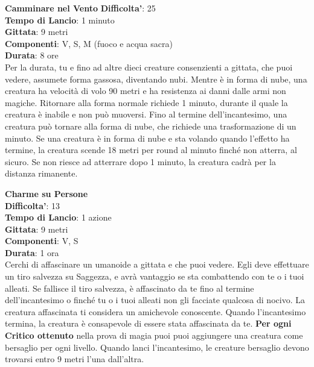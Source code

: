 \begin{multicols}{2}
\medskip\textbf{Camminare nel Vento}
\textbf{Difficolta'}: 25\\
\textbf{Tempo di Lancio}: 1 minuto\\
\textbf{Gittata}: 9 metri\\
\textbf{Componenti}: V, S, M (fuoco e acqua sacra)\\
\textbf{Durata}: 8 ore\\
Per la durata, tu e fino ad altre dieci creature consenzienti a gittata, che puoi vedere, assumete forma gassosa, diventando nubi. Mentre è in forma di nube, una creatura ha velocità di volo 90 metri e ha resistenza ai danni dalle armi non magiche. Ritornare alla forma normale richiede 1 minuto, durante il quale la creatura è inabile e non può muoversi. Fino al termine dell’incantesimo, una creatura può tornare alla forma di nube, che richiede una trasformazione di un minuto. Se una creatura è in forma di nube e sta volando quando l’effetto ha termine, la creatura scende 18 metri per round al minuto finché non atterra, al sicuro. Se non riesce ad atterrare dopo 1 minuto, la creatura cadrà per la distanza rimanente.

\medskip\textbf{Charme su Persone}\\
\textbf{Difficolta'}: 13\\
\textbf{Tempo di Lancio}: 1 azione\\
\textbf{Gittata}: 9 metri\\
\textbf{Componenti}: V, S\\
\textbf{Durata}: 1 ora\\
Cerchi di affascinare un umanoide a gittata e che puoi vedere. Egli deve effettuare un tiro salvezza su Saggezza, e avrà vantaggio se sta combattendo con te o i tuoi alleati. Se fallisce il tiro salvezza, è affascinato da te fino al termine dell’incantesimo o finché tu o i tuoi alleati non gli facciate qualcosa di nocivo. La creatura affascinata ti considera un amichevole conoscente. Quando l’incantesimo termina, la creatura è consapevole di essere stata affascinata da te. 
\textbf{Per ogni Critico ottenuto} nella prova di magia puoi puoi aggiungere una creatura come bersaglio per ogni livello. Quando lanci l’incantesimo, le creature bersaglio devono trovarsi entro 9 metri l’una dall’altra.



\end{multicols}
